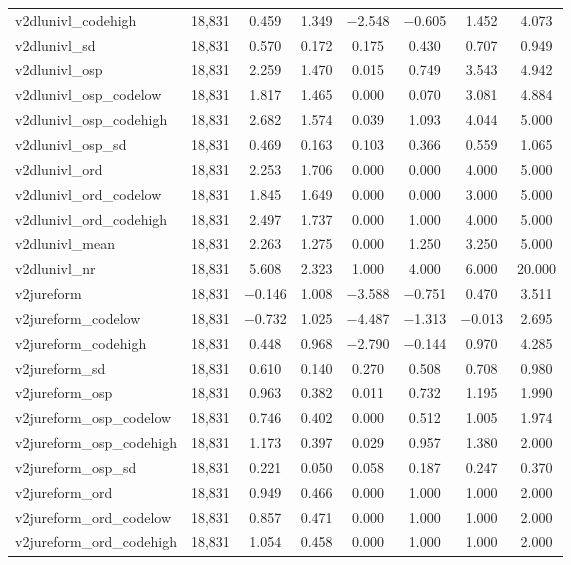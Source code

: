 \begin{table}[!htbp]
\begin{tabular}{@{\extracolsep{5pt}}lccccccc}
v2dlunivl\_codehigh & 18,831 & 0.459 & 1.349 & $-$2.548 & $-$0.605 & 1.452 & 4.073 \\ 
v2dlunivl\_sd & 18,831 & 0.570 & 0.172 & 0.175 & 0.430 & 0.707 & 0.949 \\ 
v2dlunivl\_osp & 18,831 & 2.259 & 1.470 & 0.015 & 0.749 & 3.543 & 4.942 \\ 
v2dlunivl\_osp\_codelow & 18,831 & 1.817 & 1.465 & 0.000 & 0.070 & 3.081 & 4.884 \\ 
v2dlunivl\_osp\_codehigh & 18,831 & 2.682 & 1.574 & 0.039 & 1.093 & 4.044 & 5.000 \\ 
v2dlunivl\_osp\_sd & 18,831 & 0.469 & 0.163 & 0.103 & 0.366 & 0.559 & 1.065 \\ 
v2dlunivl\_ord & 18,831 & 2.253 & 1.706 & 0.000 & 0.000 & 4.000 & 5.000 \\ 
v2dlunivl\_ord\_codelow & 18,831 & 1.845 & 1.649 & 0.000 & 0.000 & 3.000 & 5.000 \\ 
v2dlunivl\_ord\_codehigh & 18,831 & 2.497 & 1.737 & 0.000 & 1.000 & 4.000 & 5.000 \\ 
v2dlunivl\_mean & 18,831 & 2.263 & 1.275 & 0.000 & 1.250 & 3.250 & 5.000 \\ 
v2dlunivl\_nr & 18,831 & 5.608 & 2.323 & 1.000 & 4.000 & 6.000 & 20.000 \\ 
v2jureform & 18,831 & $-$0.146 & 1.008 & $-$3.588 & $-$0.751 & 0.470 & 3.511 \\ 
v2jureform\_codelow & 18,831 & $-$0.732 & 1.025 & $-$4.487 & $-$1.313 & $-$0.013 & 2.695 \\ 
v2jureform\_codehigh & 18,831 & 0.448 & 0.968 & $-$2.790 & $-$0.144 & 0.970 & 4.285 \\ 
v2jureform\_sd & 18,831 & 0.610 & 0.140 & 0.270 & 0.508 & 0.708 & 0.980 \\ 
v2jureform\_osp & 18,831 & 0.963 & 0.382 & 0.011 & 0.732 & 1.195 & 1.990 \\ 
v2jureform\_osp\_codelow & 18,831 & 0.746 & 0.402 & 0.000 & 0.512 & 1.005 & 1.974 \\ 
v2jureform\_osp\_codehigh & 18,831 & 1.173 & 0.397 & 0.029 & 0.957 & 1.380 & 2.000 \\ 
v2jureform\_osp\_sd & 18,831 & 0.221 & 0.050 & 0.058 & 0.187 & 0.247 & 0.370 \\ 
v2jureform\_ord & 18,831 & 0.949 & 0.466 & 0.000 & 1.000 & 1.000 & 2.000 \\ 
v2jureform\_ord\_codelow & 18,831 & 0.857 & 0.471 & 0.000 & 1.000 & 1.000 & 2.000 \\ 
v2jureform\_ord\_codehigh & 18,831 & 1.054 & 0.458 & 0.000 & 1.000 & 1.000 & 2.000 \\ 

\end{tabular}
\end{table}
